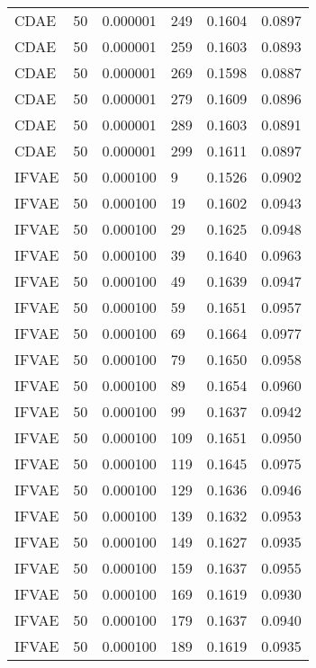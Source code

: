 \begin{tabular}{llrlrr}
    CDAE &   50 &  0.000001 &   249 &  0.1604 &       0.0897 \\
    CDAE &   50 &  0.000001 &   259 &  0.1603 &       0.0893 \\
    CDAE &   50 &  0.000001 &   269 &  0.1598 &       0.0887 \\
    CDAE &   50 &  0.000001 &   279 &  0.1609 &       0.0896 \\
    CDAE &   50 &  0.000001 &   289 &  0.1603 &       0.0891 \\
    CDAE &   50 &  0.000001 &   299 &  0.1611 &       0.0897 \\
   IFVAE &   50 &  0.000100 &     9 &  0.1526 &       0.0902 \\
   IFVAE &   50 &  0.000100 &    19 &  0.1602 &       0.0943 \\
   IFVAE &   50 &  0.000100 &    29 &  0.1625 &       0.0948 \\
   IFVAE &   50 &  0.000100 &    39 &  0.1640 &       0.0963 \\
   IFVAE &   50 &  0.000100 &    49 &  0.1639 &       0.0947 \\
   IFVAE &   50 &  0.000100 &    59 &  0.1651 &       0.0957 \\
   IFVAE &   50 &  0.000100 &    69 &  0.1664 &       0.0977 \\
   IFVAE &   50 &  0.000100 &    79 &  0.1650 &       0.0958 \\
   IFVAE &   50 &  0.000100 &    89 &  0.1654 &       0.0960 \\
   IFVAE &   50 &  0.000100 &    99 &  0.1637 &       0.0942 \\
   IFVAE &   50 &  0.000100 &   109 &  0.1651 &       0.0950 \\
   IFVAE &   50 &  0.000100 &   119 &  0.1645 &       0.0975 \\
   IFVAE &   50 &  0.000100 &   129 &  0.1636 &       0.0946 \\
   IFVAE &   50 &  0.000100 &   139 &  0.1632 &       0.0953 \\
   IFVAE &   50 &  0.000100 &   149 &  0.1627 &       0.0935 \\
   IFVAE &   50 &  0.000100 &   159 &  0.1637 &       0.0955 \\
   IFVAE &   50 &  0.000100 &   169 &  0.1619 &       0.0930 \\
   IFVAE &   50 &  0.000100 &   179 &  0.1637 &       0.0940 \\
   IFVAE &   50 &  0.000100 &   189 &  0.1619 &       0.0935 \\

\end{tabular}
